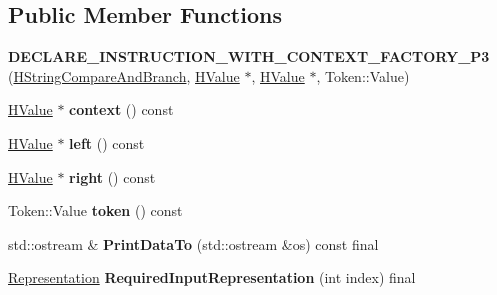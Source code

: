 \subsection*{Public Member Functions}
\begin{DoxyCompactItemize}
\item 
{\bfseries D\+E\+C\+L\+A\+R\+E\+\_\+\+I\+N\+S\+T\+R\+U\+C\+T\+I\+O\+N\+\_\+\+W\+I\+T\+H\+\_\+\+C\+O\+N\+T\+E\+X\+T\+\_\+\+F\+A\+C\+T\+O\+R\+Y\+\_\+\+P3} (\hyperlink{classv8_1_1internal_1_1_h_string_compare_and_branch}{H\+String\+Compare\+And\+Branch}, \hyperlink{classv8_1_1internal_1_1_h_value}{H\+Value} $\ast$, \hyperlink{classv8_1_1internal_1_1_h_value}{H\+Value} $\ast$, Token\+::\+Value)\hypertarget{classv8_1_1internal_1_1_h_string_compare_and_branch_a2ed055214a9c022e038fad08145cbba7}{}\label{classv8_1_1internal_1_1_h_string_compare_and_branch_a2ed055214a9c022e038fad08145cbba7}

\item 
\hyperlink{classv8_1_1internal_1_1_h_value}{H\+Value} $\ast$ {\bfseries context} () const \hypertarget{classv8_1_1internal_1_1_h_string_compare_and_branch_a9cb70833df3de09786eeb02663a07e0a}{}\label{classv8_1_1internal_1_1_h_string_compare_and_branch_a9cb70833df3de09786eeb02663a07e0a}

\item 
\hyperlink{classv8_1_1internal_1_1_h_value}{H\+Value} $\ast$ {\bfseries left} () const \hypertarget{classv8_1_1internal_1_1_h_string_compare_and_branch_a2bb44bd4a2024d567a4ded76b7cede0f}{}\label{classv8_1_1internal_1_1_h_string_compare_and_branch_a2bb44bd4a2024d567a4ded76b7cede0f}

\item 
\hyperlink{classv8_1_1internal_1_1_h_value}{H\+Value} $\ast$ {\bfseries right} () const \hypertarget{classv8_1_1internal_1_1_h_string_compare_and_branch_a9629c990d5c42c129b6ab283f893a5bb}{}\label{classv8_1_1internal_1_1_h_string_compare_and_branch_a9629c990d5c42c129b6ab283f893a5bb}

\item 
Token\+::\+Value {\bfseries token} () const \hypertarget{classv8_1_1internal_1_1_h_string_compare_and_branch_af2f29e557add0f11fe8507fef0273a8b}{}\label{classv8_1_1internal_1_1_h_string_compare_and_branch_af2f29e557add0f11fe8507fef0273a8b}

\item 
std\+::ostream \& {\bfseries Print\+Data\+To} (std\+::ostream \&os) const  final\hypertarget{classv8_1_1internal_1_1_h_string_compare_and_branch_a0ee8cfce6a8e07524fb10f420c73e5f5}{}\label{classv8_1_1internal_1_1_h_string_compare_and_branch_a0ee8cfce6a8e07524fb10f420c73e5f5}

\item 
\hyperlink{classv8_1_1internal_1_1_representation}{Representation} {\bfseries Required\+Input\+Representation} (int index) final\hypertarget{classv8_1_1internal_1_1_h_string_compare_and_branch_abdb66b84a427a58cbdd35489fb949042}{}\label{classv8_1_1internal_1_1_h_string_compare_and_branch_abdb66b84a427a58cbdd35489fb949042}

\end{DoxyCompactItemize}
